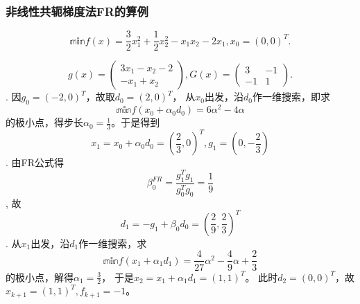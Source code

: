         \subsubsection{非线性共轭梯度法FR的算例}
        \begin{example}
            \begin{equation}
                \mathbb{min}f(x) = \frac{3}{2}x_1^2+\frac{1}{2}x_2^2-x_1x_2-2x_1,
                x_0 = (0,0)^T.
            \nonumber
            \end{equation}
        \end{example}
        \begin{solution}
            \begin{equation}
                g(x) = 
                \begin{pmatrix}
                    3x_1-x_2-2 \\
                    -x_1+x_2  
                \end{pmatrix},
                G(x) = 
                \begin{pmatrix}
                    3 & -1\\
                    -1 & 1   
                \end{pmatrix}.
            \nonumber    
            \end{equation}.
            因$g_0=(-2,0)^T$，故取$d_0=(2,0)^T$，
            从$x_0$出发，沿$d_0$作一维搜索，即求
            \begin{equation}
            \mathbb{min}f(x_0+\alpha_0 d_0) = 6\alpha^2-4\alpha
                \nonumber
            \end{equation}
            的极小点，得步长$\alpha_0 = \frac{1}{3}$。于是得到
            \begin{equation}
                x_1=x_0 + \alpha_0d_0=(\frac{2}{3},0)^T,
                g_1 = (0,-\frac{2}{3})
                \nonumber
            \end{equation}.
            由FR公式得
            \begin{equation}
                \beta_{0}^{FR}=\displaystyle\frac{g_1^Tg_1}{g_{0}^Tg_{0}} = \frac{1}{9}
                \nonumber
            \end{equation},
            故
            \begin{equation}
                d_1 = -g_1 + \beta_0d_0=(\frac{2}{9},\frac{2}{3})^T
                \nonumber
            \end{equation}.
            从$x_1$出发，沿$d_1$作一维搜索，求
            \begin{equation}
                \mathbb{min}f(x_1+\alpha_1 d_1) = 
                \frac{4}{27}\alpha^2-\frac{4}{9}\alpha + \frac{2}{3}
                \nonumber
            \end{equation}
            的极小点，解得$\alpha_1= \frac{3}{2}$，
            于是$x_2 = x_1 + \alpha_1d_1 = (1,1)^T$。
            此时$d_2=(0,0)^T$，故$x_{k+1}=(1,1)^T, f_{k+1} = -1$。
        \end{solution}
        

